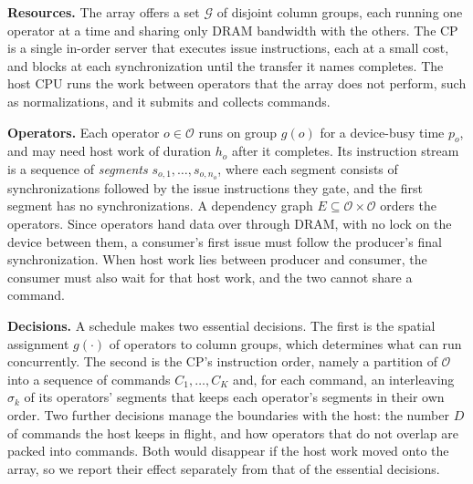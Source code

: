 \textbf{Resources.}
The array offers a set $\mathcal{G}$ of disjoint column groups, each running one operator at a time and sharing only DRAM bandwidth with the others.
The CP is a single in-order server that executes issue instructions, each at a small cost, and blocks at each synchronization until the transfer it names completes.
The host CPU runs the work between operators that the array does not perform, such as normalizations, and it submits and collects commands.

\textbf{Operators.}
Each operator $o \in \mathcal{O}$ runs on group $g(o)$ for a device-busy time $p_o$, and may need host work of duration $h_o$ after it completes.
Its instruction stream is a sequence of \emph{segments} $s_{o,1}, \dots, s_{o,n_o}$, where each segment consists of synchronizations followed by the issue instructions they gate, and the first segment has no synchronizations.
A dependency graph $E \subseteq \mathcal{O} \times \mathcal{O}$ orders the operators.
Since operators hand data over through DRAM, with no lock on the device between them, a consumer's first issue must follow the producer's final synchronization.
When host work lies between producer and consumer, the consumer must also wait for that host work, and the two cannot share a command.

\textbf{Decisions.}
A schedule makes two essential decisions.
The first is the spatial assignment $g(\cdot)$ of operators to column groups, which determines what can run concurrently.
The second is the CP's instruction order, namely a partition of $\mathcal{O}$ into a sequence of commands $C_1, \dots, C_K$ and, for each command, an interleaving $\sigma_k$ of its operators' segments that keeps each operator's segments in their own order.
Two further decisions manage the boundaries with the host: the number $D$ of commands the host keeps in flight, and how operators that do not overlap are packed into commands.
Both would disappear if the host work moved onto the array, so we report their effect separately from that of the essential decisions.

